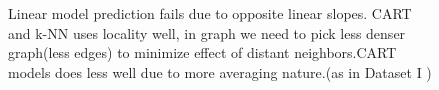 \documentclass[a4paper]{article}
\begin{document}
\begin{figure}[H]
{    \label{fig:subfig5}
}
\caption[Optional caption for list of figures]{
Linear model prediction fails due to opposite linear slopes. CART 
and k-NN uses locality well, in graph we need to pick less denser graph(less edges) to minimize effect of distant neighbors.CART models does less well due to more averaging nature.(as in Dataset I )}
\label{fig:subfigureExample}
\end{figure}

\end{document}
